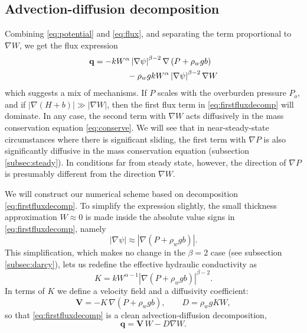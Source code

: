 \documentclass[gmd]{copernicus}   %
\begin{document}
\subsection{Advection-diffusion decomposition}  \label{subsec:advectdiffus}  Combining \eqref{eq:potential} and \eqref{eq:flux}, and separating the term proportional to $\nabla W$, we get the flux expression
\begin{align}
\mathbf{q} &= - k  W^\alpha \left|\nabla \psi\right|^{\beta-2} \nabla \left(P + \rho_w g b\right)  \label{eq:firstfluxdecomp} \\
    &\qquad\qquad - \rho_w g k W^\alpha \left|\nabla \psi\right|^{\beta-2} \nabla W  \notag
\end{align}
which suggests a mix of mechanisms.  If $P$ scales with the overburden pressure $P_o$, and if $|\nabla (H+b)| \gg |\nabla W|$, then the first flux term in \eqref{eq:firstfluxdecomp} will dominate.  In any case, the second term with $\nabla W$ acts diffusively in the mass conservation equation \eqref{eq:conserve}.  We will see that in near-steady-state circumstances where there is significant sliding, the first term with $\nabla P$ is also significantly diffusive in the mass conservation equation (subsection \ref{subsec:steady}).  In conditions far from steady state, however, the direction of $\nabla P$ is presumably different from the direction $\nabla W$.

We will construct our numerical scheme based on decomposition \eqref{eq:firstfluxdecomp}.  To simplify the expression slightly, the small thickness approximation $W\approx 0$ is made inside the absolute value signs in \eqref{eq:firstfluxdecomp}, namely
\begin{equation}
\left|\nabla \psi\right| \approx \left|\nabla \left(P + \rho_w g b \right)\right|.  \label{eq:Wsmall}
\end{equation}
This simplification, which makes no change in the $\beta=2$ case (see subsection \ref{subsec:darcy}), lets us redefine the effective hydraulic conductivity as
\begin{equation}
K = k W^{\alpha-1} \left|\nabla(P+\rho_w g b)\right|^{\beta - 2}. \label{eq:Kdefine}
\end{equation}
In terms of $K$ we define a velocity field and a diffusivity coefficient:
\begin{equation} \label{eq:vexpression}
  \mathbf{V} = - K\, \nabla \left(P + \rho_w g b\right), \qquad D = \rho_w g K W,
\end{equation}
so that \eqref{eq:firstfluxdecomp} is a clean advection-diffusion decomposition,
\begin{equation} \label{eq:qexpression}
  \mathbf{q} = \mathbf{V}\, W - D \nabla W.
\end{equation}
\end{document}
